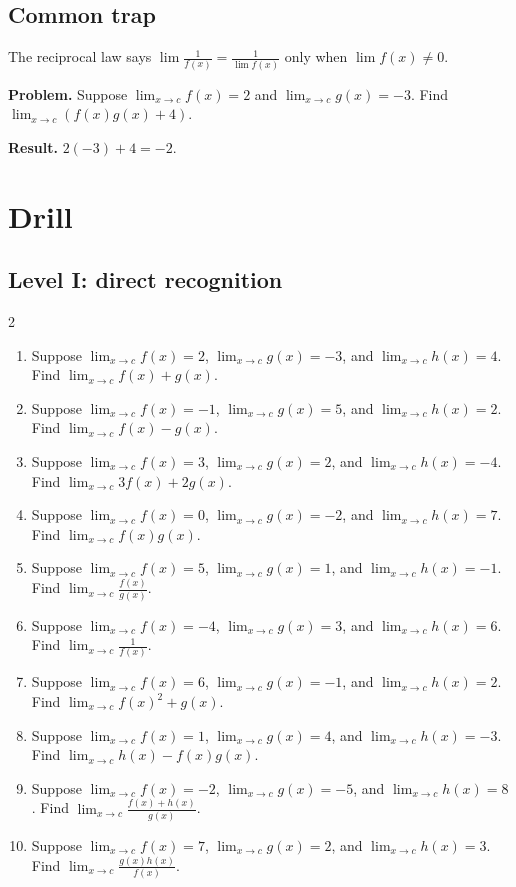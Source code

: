 \documentclass[11pt,oneside]{book}
\newenvironment{examplebox}[1]{\par\medskip\noindent{\color{steel}\bfseries #1}\par\noindent{\color{steel}\hrule}\smallskip}{\par\smallskip\noindent{\color{steel}\hrule}\par\medskip}
\begin{document}
\subsection*{Common trap}
The reciprocal law says $\lim \frac{1}{f(x)}=\frac{1}{\lim f(x)}$ only when $\lim f(x)\ne0$.
\begin{examplebox}{Worked example}
\textbf{Problem.} Suppose $\lim_{x\to c} f(x)=2$ and $\lim_{x\to c} g(x)=-3$. Find $\lim_{x\to c}(f(x)g(x)+4)$.

\textbf{Result.} $2(-3)+4=-2$.
\end{examplebox}
\section*{Drill}
\subsection*{Level I: direct recognition}
\begin{multicols}{2}
\begin{enumerate}[leftmargin=*,label=\textbf{\arabic*.},itemsep=0.65\baselineskip]
\item Suppose $\lim_{x\to c} f(x)=2$, $\lim_{x\to c} g(x)=-3$, and $\lim_{x\to c} h(x)=4$. Find $\displaystyle\lim_{x\to c} f(x)+g(x)$.
\item Suppose $\lim_{x\to c} f(x)=-1$, $\lim_{x\to c} g(x)=5$, and $\lim_{x\to c} h(x)=2$. Find $\displaystyle\lim_{x\to c} f(x)-g(x)$.
\item Suppose $\lim_{x\to c} f(x)=3$, $\lim_{x\to c} g(x)=2$, and $\lim_{x\to c} h(x)=-4$. Find $\displaystyle\lim_{x\to c} 3f(x)+2g(x)$.
\item Suppose $\lim_{x\to c} f(x)=0$, $\lim_{x\to c} g(x)=-2$, and $\lim_{x\to c} h(x)=7$. Find $\displaystyle\lim_{x\to c} f(x)g(x)$.
\item Suppose $\lim_{x\to c} f(x)=5$, $\lim_{x\to c} g(x)=1$, and $\lim_{x\to c} h(x)=-1$. Find $\displaystyle\lim_{x\to c} \frac{f(x)}{g(x)}$.
\item Suppose $\lim_{x\to c} f(x)=-4$, $\lim_{x\to c} g(x)=3$, and $\lim_{x\to c} h(x)=6$. Find $\displaystyle\lim_{x\to c} \frac{1}{f(x)}$.
\item Suppose $\lim_{x\to c} f(x)=6$, $\lim_{x\to c} g(x)=-1$, and $\lim_{x\to c} h(x)=2$. Find $\displaystyle\lim_{x\to c} f(x)^2+g(x)$.
\item Suppose $\lim_{x\to c} f(x)=1$, $\lim_{x\to c} g(x)=4$, and $\lim_{x\to c} h(x)=-3$. Find $\displaystyle\lim_{x\to c} h(x)-f(x)g(x)$.
\item Suppose $\lim_{x\to c} f(x)=-2$, $\lim_{x\to c} g(x)=-5$, and $\lim_{x\to c} h(x)=8$. Find $\displaystyle\lim_{x\to c} \frac{f(x)+h(x)}{g(x)}$.
\item Suppose $\lim_{x\to c} f(x)=7$, $\lim_{x\to c} g(x)=2$, and $\lim_{x\to c} h(x)=3$. Find $\displaystyle\lim_{x\to c} \frac{g(x)h(x)}{f(x)}$.
\end{enumerate}
\end{multicols}
\end{document}
